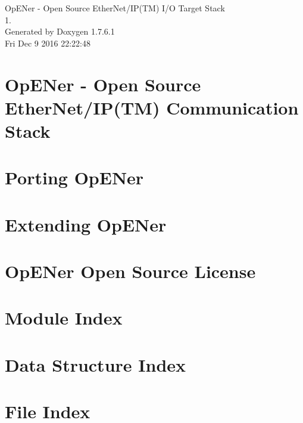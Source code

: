 \documentclass[a4paper]{book}
\begin{document}
\hypersetup{pageanchor=false,citecolor=blue}
\begin{titlepage}
\vspace*{7cm}
\begin{center}
{\Large \-Op\-E\-Ner -\/ \-Open \-Source \-Ether\-Net/\-I\-P(\-T\-M) \-I/\-O \-Target \-Stack \\[1ex]\large 1. }\\
\vspace*{1cm}
{\large \-Generated by Doxygen 1.7.6.1}\\
\vspace*{0.5cm}
{\small Fri Dec 9 2016 22:22:48}\\
\end{center}
\end{titlepage}
\clearemptydoublepage
{}
\tableofcontents
\clearemptydoublepage
{}
\hypersetup{pageanchor=true,citecolor=blue}
\chapter{\-Op\-E\-Ner -\/ \-Open \-Source \-Ether\-Net/\-I\-P(\-T\-M) \-Communication \-Stack}
\label{index}\hypertarget{index}{}
\chapter{\-Porting \-Op\-E\-Ner}
\label{porting}
\hypertarget{porting}{}

\chapter{\-Extending \-Op\-E\-Ner}
\label{extending}
\hypertarget{extending}{}

\chapter{\-Op\-E\-Ner \-Open \-Source \-License}
\label{license}
\hypertarget{license}{}

\chapter{\-Module \-Index}

\chapter{\-Data \-Structure \-Index}

\chapter{\-File \-Index}

\end{document}
